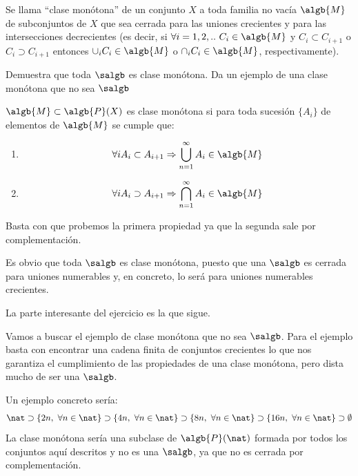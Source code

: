 \begin{problem}[13]
Se llama ``clase monótona'' de un conjunto $X$ a toda familia no vacía $\algb{M}$ de subconjuntos de $X$ que sea cerrada para las uniones crecientes y para las intersecciones decrecientes (es decir, si $\forall i=1,2,.. \ C_i \in \algb{M}$ y $C_i \subset C_{i+1}$ o $C_i \supset C_{i+1}$ entonces $\cup_iC_i \in \algb{M}$ o $\cap_iC_i \in \algb{M}$, respectivamente).

Demuestra que toda $\salgb$ es clase monótona. Da un ejemplo de una clase monótona que no sea $\salgb$
\solution

\begin{defn}
$\algb{M} \subset \algb{P}(X)$ es clase monótona si para toda sucesión $\{A_i\}$ de elementos de $\algb{M}$ se cumple que:
\begin{enumerate}
\item \[\forall i A_i \subset A_{i+1} \Rightarrow \bigcup_{n=1}^{\infty}A_i \in \algb{M}\]
\item \[\forall i A_i \supset A_{i+1} \Rightarrow \bigcap_{n=1}^{\infty}A_i \in \algb{M}\]
\end{enumerate}
\end{defn}
Basta con que probemos la primera propiedad ya que la segunda sale por complementación.

Es obvio que toda $\salgb$ es clase monótona, puesto que una $\salgb$ es cerrada para uniones numerables y, en concreto, lo será para uniones numerables crecientes.

La parte interesante del ejercicio es la que sigue.

Vamos a buscar el ejemplo de clase monótona que no sea $\salgb$.
Para el ejemplo basta con encontrar una cadena finita de conjuntos crecientes lo que nos garantiza el cumplimiento de las propiedades de una clase monótona, pero dista mucho de ser una $\salgb$.

Un ejemplo concreto sería:
\[\nat \supset \{2n, \ \forall n \in \nat\}\supset \{4n, \ \forall n \in \nat\}\supset \{8n, \ \forall n \in \nat\}\supset \{16n, \ \forall n \in \nat\}\supset \emptyset\]
La clase monótona sería una subclase de $\algb{P}(\nat)$ formada por todos los conjuntos aquí descritos y no es una $\salgb$, ya que no es cerrada por complementación.
\end{problem}

